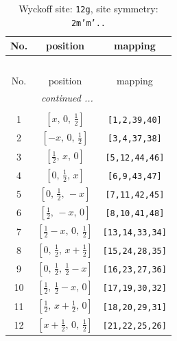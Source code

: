 \documentclass[fleqn,8pt]{jsarticle}
\begin{document}
\begin{longtable}{ccc}
\caption{Wyckoff site: {\tt 12g}, site symmetry: {\tt 2m'm'..}}
 \\
 \hline \hline
No. & position & mapping \\ \hline \endfirsthead

\multicolumn{2}{l}{\tablename\ \thetable{}} \\
 \hline \hline
No. & position & mapping \\ \hline \endhead

 \hline \hline
\multicolumn{2}{r}{\footnotesize\it continued ...} \\ \endfoot

 \hline \hline
\multicolumn{2}{r}{} \\ \endlastfoot

1 & $\left[ x,\, 0,\, \frac{1}{2} \right]$ & {\tt [1,2,39,40]} \\ \hline
2 & $\left[ - x,\, 0,\, \frac{1}{2} \right]$ & {\tt [3,4,37,38]} \\ \hline
3 & $\left[ \frac{1}{2},\, x,\, 0 \right]$ & {\tt [5,12,44,46]} \\ \hline
4 & $\left[ 0,\, \frac{1}{2},\, x \right]$ & {\tt [6,9,43,47]} \\ \hline
5 & $\left[ 0,\, \frac{1}{2},\, - x \right]$ & {\tt [7,11,42,45]} \\ \hline
6 & $\left[ \frac{1}{2},\, - x,\, 0 \right]$ & {\tt [8,10,41,48]} \\ \hline
7 & $\left[ \frac{1}{2} - x,\, 0,\, \frac{1}{2} \right]$ & {\tt [13,14,33,34]} \\ \hline
8 & $\left[ 0,\, \frac{1}{2},\, x + \frac{1}{2} \right]$ & {\tt [15,24,28,35]} \\ \hline
9 & $\left[ 0,\, \frac{1}{2},\, \frac{1}{2} - x \right]$ & {\tt [16,23,27,36]} \\ \hline
10 & $\left[ \frac{1}{2},\, \frac{1}{2} - x,\, 0 \right]$ & {\tt [17,19,30,32]} \\ \hline
11 & $\left[ \frac{1}{2},\, x + \frac{1}{2},\, 0 \right]$ & {\tt [18,20,29,31]} \\ \hline
12 & $\left[ x + \frac{1}{2},\, 0,\, \frac{1}{2} \right]$ & {\tt [21,22,25,26]} \\
\end{longtable}
\renewcommand{\arraystretch}{1.2}
\end{document}
